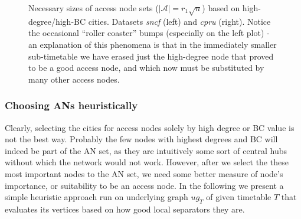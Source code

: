 		\begin{figure}[htb]
		\centering
	    \caption{\label{plot:hbcdeg-size} Necessary sizes of access node sets ($|\mathcal{A}| = r_{1} \sqrt{n}$) based on high-degree/high-BC cities. Datasets \textit{sncf} (left) and \textit{cpru} (right). Notice the occasional ``roller coaster'' bumps (especially on the left plot) - an explanation of this phenomena is that in the immediately smaller sub-timetable we have erased just the high-degree node that proved to be a good access node, and which now must be substituted by many other access nodes.}
		\end{figure}
		
	\subsubsection{Choosing ANs heuristically}
	
		Clearly, selecting the cities for access nodes solely by high degree or BC value is not the best way. Probably the few nodes with highest degrees and BC will indeed be part of the AN set, as they are intuitively some sort of central hubs without which the network would not work. However, after we select the these most important nodes to the AN set, we need some better measure of node's importance, or suitability to be an access node. In the following we present a simple heuristic approach run on underlying graph $ug_{T}$ of given timetable $T$ that evaluates its vertices based on how good local separators they are.
		
